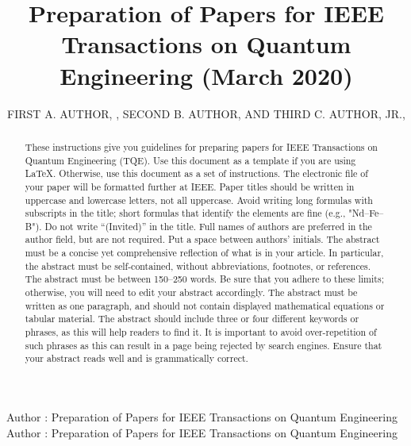 \documentclass{ieeeaccess}
\begin{document}

\title{Preparation of Papers for IEEE Transactions on Quantum Engineering (March 2020)}
\author{\uppercase{First A. Author}, ,
    \uppercase{Second B. Author, and Third C. Author,
        Jr}.,
    }
\address[1]{National Institute of Standards and
    Technology, Boulder, CO 80305 USA (email: author@boulder.nist.gov)}
\address[2]{Department of Physics, Colorado State University, Fort Collins,
    CO 80523 USA (email: author@lamar.colostate.edu)}
\address[3]{Electrical Engineering Department, University of Colorado, Boulder, CO
    80309 USA}

\markboth
{Author \headeretal: Preparation of Papers for IEEE Transactions on Quantum Engineering}
{Author \headeretal: Preparation of Papers for IEEE Transactions on Quantum Engineering}


\begin{abstract}
    These instructions give you guidelines for preparing papers for
    IEEE Transactions on Quantum Engineering (TQE). Use this document as a template if you are
    using \LaTeX. Otherwise, use this document as a set of
    instructions. The electronic file of your paper will be formatted further
    at IEEE. Paper titles should be written in uppercase and lowercase letters,
    not all uppercase. Avoid writing long formulas with subscripts in the title;
    short formulas that identify the elements are fine (e.g., "Nd--Fe--B"). Do
    not write ``(Invited)'' in the title. Full names of authors are preferred in
    the author field, but are not required. Put a space between authors'
    initials. The abstract must be a concise yet comprehensive reflection of
    what is in your article. In particular, the abstract must be self-contained,
    without abbreviations, footnotes, or references. The abstract must be between
    150--250 words. Be sure that
    you adhere to these limits; otherwise, you will need to edit your abstract
    accordingly. The abstract must be written as one paragraph, and should not
    contain displayed mathematical equations or tabular material. The abstract
    should include three or four different keywords or phrases, as this will
    help readers to find it. It is important to avoid over-repetition of such
    phrases as this can result in a page being rejected by search engines.
    Ensure that your abstract reads well and is grammatically correct.
\end{abstract}
\end{document}
